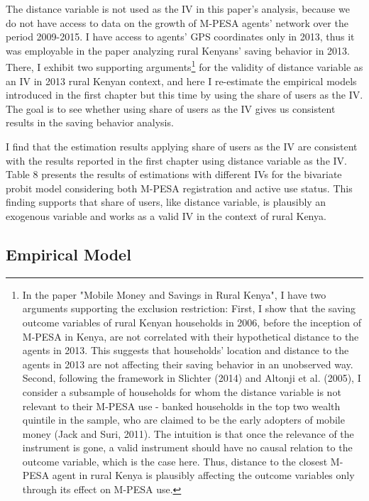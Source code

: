 \documentclass[11pt]{article}
\numberwithin{equation}{section}
\begin{document}
The distance variable is not used as the IV in this paper's analysis, because we do not have access to data on the growth of M-PESA agents' network over the period 2009-2015. I have access to agents' GPS coordinates only in 2013, thus it was employable in the paper analyzing rural Kenyans' saving behavior in 2013. There, I  exhibit two supporting arguments\footnote{In the paper "Mobile Money and Savings in Rural Kenya", I have two arguments supporting the exclusion restriction: First, I show that the saving outcome variables of rural Kenyan households in 2006, before the inception of M-PESA in Kenya, are not correlated with their hypothetical distance to the agents in 2013. This suggests that households' location and distance to the agents in 2013 are not affecting their saving behavior in an unobserved way. Second, following the framework in Slichter (2014) and Altonji et al. (2005), I consider a subsample of households for whom the distance variable is not relevant to their M-PESA use - banked households in the top two wealth quintile in the sample, who are claimed to be the early adopters of mobile money (Jack and Suri, 2011). The intuition is that once the relevance of the instrument is gone, a valid instrument should have no causal relation to the outcome variable, which is the case here. Thus, distance to the closest M-PESA agent in rural Kenya is plausibly affecting the outcome variables only through its effect on M-PESA use.} for the validity of distance variable as an IV in 2013 rural Kenyan context, and here I re-estimate the empirical models introduced in the first chapter but this time by using the share of users as the IV. The goal is to see whether using share of users as the IV gives us consistent results in the saving behavior analysis.

I find that the estimation results applying share of users as the IV are consistent with the results reported in the first chapter using distance variable as the IV. Table 8 presents the results of estimations with different IVs for the bivariate probit model considering both M-PESA registration and active use status. This finding supports that share of users, like distance variable, is plausibly an exogenous variable and works as a valid IV in the context of rural Kenya. 




\subsection{Empirical Model}
\end{document}
